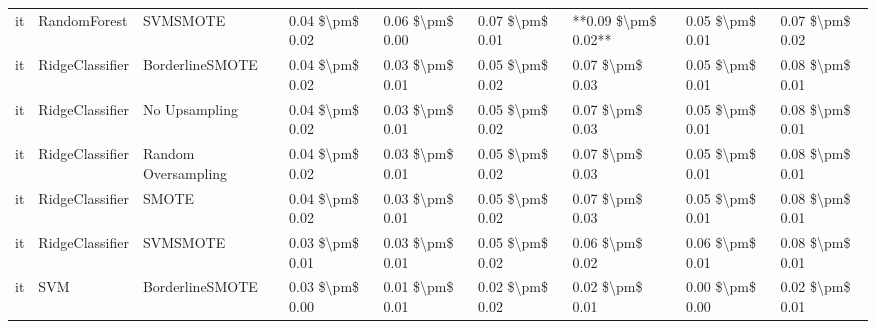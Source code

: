 \begin{tabular}{lllllllll}
      it &                    RandomForest &                      SVMSMOTE & 0.04 \$\textbackslash pm\$ 0.02 &           0.06 \$\textbackslash pm\$ 0.00 &       0.07 \$\textbackslash pm\$ 0.01 &    **0.09 \$\textbackslash pm\$ 0.02** &                         0.05 \$\textbackslash pm\$ 0.01 &     0.07 \$\textbackslash pm\$ 0.02 \\
      it &                 RidgeClassifier &               BorderlineSMOTE & 0.04 \$\textbackslash pm\$ 0.02 &           0.03 \$\textbackslash pm\$ 0.01 &       0.05 \$\textbackslash pm\$ 0.02 &        0.07 \$\textbackslash pm\$ 0.03 &                         0.05 \$\textbackslash pm\$ 0.01 &     0.08 \$\textbackslash pm\$ 0.01 \\
      it &                 RidgeClassifier &                 No Upsampling & 0.04 \$\textbackslash pm\$ 0.02 &           0.03 \$\textbackslash pm\$ 0.01 &       0.05 \$\textbackslash pm\$ 0.02 &        0.07 \$\textbackslash pm\$ 0.03 &                         0.05 \$\textbackslash pm\$ 0.01 &     0.08 \$\textbackslash pm\$ 0.01 \\
      it &                 RidgeClassifier &           Random Oversampling & 0.04 \$\textbackslash pm\$ 0.02 &           0.03 \$\textbackslash pm\$ 0.01 &       0.05 \$\textbackslash pm\$ 0.02 &        0.07 \$\textbackslash pm\$ 0.03 &                         0.05 \$\textbackslash pm\$ 0.01 &     0.08 \$\textbackslash pm\$ 0.01 \\
      it &                 RidgeClassifier &                         SMOTE & 0.04 \$\textbackslash pm\$ 0.02 &           0.03 \$\textbackslash pm\$ 0.01 &       0.05 \$\textbackslash pm\$ 0.02 &        0.07 \$\textbackslash pm\$ 0.03 &                         0.05 \$\textbackslash pm\$ 0.01 &     0.08 \$\textbackslash pm\$ 0.01 \\
      it &                 RidgeClassifier &                      SVMSMOTE & 0.03 \$\textbackslash pm\$ 0.01 &           0.03 \$\textbackslash pm\$ 0.01 &       0.05 \$\textbackslash pm\$ 0.02 &        0.06 \$\textbackslash pm\$ 0.02 &                         0.06 \$\textbackslash pm\$ 0.01 &     0.08 \$\textbackslash pm\$ 0.01 \\
      it &                             SVM &               BorderlineSMOTE & 0.03 \$\textbackslash pm\$ 0.00 &           0.01 \$\textbackslash pm\$ 0.01 &       0.02 \$\textbackslash pm\$ 0.02 &        0.02 \$\textbackslash pm\$ 0.01 &                         0.00 \$\textbackslash pm\$ 0.00 &     0.02 \$\textbackslash pm\$ 0.01 \\

\end{tabular}
